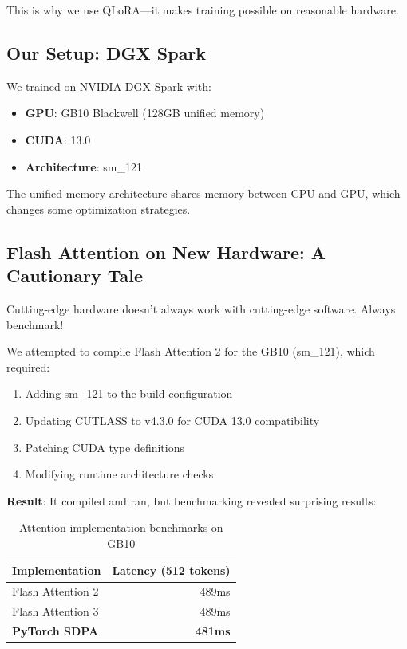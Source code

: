 \documentclass[11pt,a4paper]{article}
\begin{document}
This is why we use QLoRA---it makes training possible on reasonable hardware.

\subsection{Our Setup: DGX Spark}

We trained on NVIDIA DGX Spark with:
\begin{itemize}
    \item \textbf{GPU}: GB10 Blackwell (128GB unified memory)
    \item \textbf{CUDA}: 13.0
    \item \textbf{Architecture}: sm\_121
\end{itemize}

The unified memory architecture shares memory between CPU and GPU, which changes some optimization strategies.

\subsection{Flash Attention on New Hardware: A Cautionary Tale}

\begin{keyinsight}
Cutting-edge hardware doesn't always work with cutting-edge software. Always benchmark!
\end{keyinsight}

We attempted to compile Flash Attention 2 for the GB10 (sm\_121), which required:
\begin{enumerate}
    \item Adding sm\_121 to the build configuration
    \item Updating CUTLASS to v4.3.0 for CUDA 13.0 compatibility
    \item Patching CUDA type definitions
    \item Modifying runtime architecture checks
\end{enumerate}

\textbf{Result}: It compiled and ran, but benchmarking revealed surprising results:

\begin{table}[H]
\centering
\begin{tabular}{@{}lr@{}}
\toprule
\textbf{Implementation} & \textbf{Latency (512 tokens)} \\
\midrule
Flash Attention 2 & 489ms \\
Flash Attention 3 & 489ms \\
\textbf{PyTorch SDPA} & \textbf{481ms} \\
\bottomrule
\end{tabular}
\caption{Attention implementation benchmarks on GB10}
\end{table}
\end{document}
